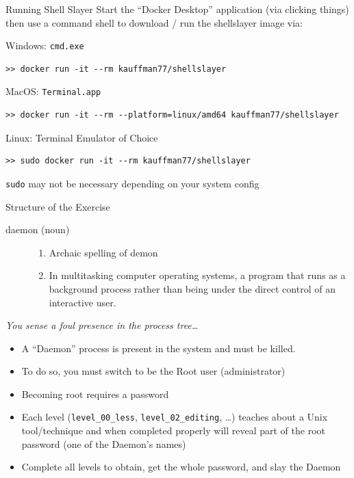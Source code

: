 \documentclass[mathserif]{beamer}
\begin{document}
\begin{frame}[label={sec:orgffcac64},fragile]{Running Shell Slayer}
 Start the ``Docker Desktop'' application (via clicking things) then use
a command shell to download / run the shellslayer image via:

\footnotesize
\begin{block}{Windows: \texttt{cmd.exe}}
\begin{verbatim}
>> docker run -it --rm kauffman77/shellslayer
\end{verbatim}
\end{block}

\begin{block}{MacOS: \texttt{Terminal.app}}
\begin{verbatim}
>> docker run -it --rm --platform=linux/amd64 kauffman77/shellslayer
\end{verbatim}
\end{block}

\begin{block}{Linux: Terminal Emulator of Choice}
\begin{verbatim}
>> sudo docker run -it --rm kauffman77/shellslayer
\end{verbatim}
\texttt{sudo} may not be necessary depending on your system config
\end{block}
\end{frame}

\begin{frame}[label={sec:org993e73f},fragile]{Structure of the Exercise}
 \begin{description}
\item[{daemon (noun)}] \begin{enumerate}
\item Archaic spelling of demon
\item In multitasking computer operating systems, a program that runs
as a background process rather than being under the direct
control of an interactive user.
\end{enumerate}
\end{description}

\normalsize
\emph{You sense a foul presence in the process tree\ldots{}}
\begin{itemize}
\item A ``Daemon'' process is present in the system and must be killed.
\item To do so, you must switch to be the Root user (administrator)
\item Becoming root requires a password
\item Each level (\texttt{level\_00\_less}, \texttt{level\_02\_editing}, \ldots{}) teaches about
a Unix tool/technique and when completed properly will reveal part
of the root password (one of the Daemon's names)
\item Complete all levels to obtain, get the whole password, and slay the
Daemon
\end{itemize}
\end{frame}
\end{document}
